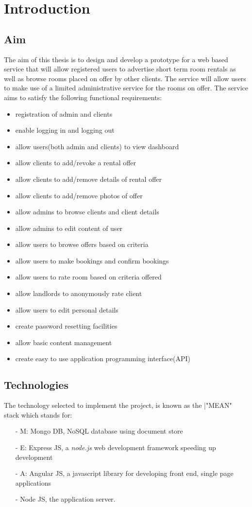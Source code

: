 \chapter*{Introduction}

\section*{Aim}
The aim of this thesis is to design and develop a prototype for a web based service that will allow registered users to advertise short term room rentals as well as browse rooms placed on offer by other clients. The service will allow users to make use of a limited administrative service for the rooms on offer. The service aims to satisfy the following functional requirements: \begin{itemize}
\item registration of admin and clients
\item enable logging in and logging out 
\item allow users(both admin and clients) to view dashboard
\item allow clients to add/revoke a rental offer
\item allow clients to add/remove details of rental offer
\item allow clients to add/remove photos of offer
\item allow admins to browse clients and client details
\item allow admins to edit content of user
\item allow users to browse offers based on criteria 
\item allow users to make bookings and confirm bookings
\item allow users to rate room based on criteria offered
\item allow landlords to anonymously rate client
\item allow users to edit personal details 
\item create password resetting facilities
\item allow basic content management
\item create easy to use application programming interface(API)
\end{itemize}
\section*{Technologies}
The technology selected to implement the project, is known as the |"MEAN" stack which stands for:
\begin{itemize}
\item[-]M: Mongo DB, NoSQL database using document store
\item[-]E: Express JS, a \textit{node.js } web development framework speeding up development 
\item[-]A: Angular JS, a javascript library for developing front end, single page applications 
\item[-] Node JS, the application server.
\end{itemize}


